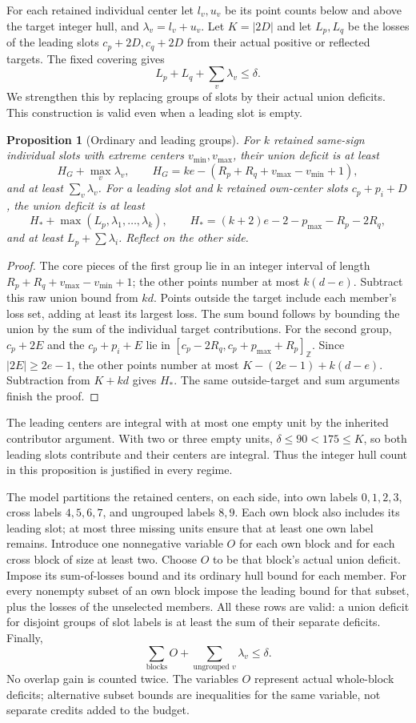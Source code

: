 \documentclass[11pt,a4paper]{article}
\newcommand{\Z}{\mathbb Z}
\newtheorem{proposition}[theorem]{Proposition}
\begin{document}
For each retained individual center let $l_v,u_v$ be its point counts
below and above the target integer hull, and $\lambda_v=l_v+u_v$.
Let $K=|2D|$ and let $L_p,L_q$ be the losses of the leading slots
$c_p+2D,c_q+2D$ from their actual positive or reflected targets.
The fixed covering gives
\begin{equation}\label{loss}
 L_p+L_q+\sum_v\lambda_v\le\delta.
\end{equation}
We strengthen this by replacing groups of slots by their actual union
deficits. This construction is valid even when a leading slot is empty.

\begin{proposition}[Ordinary and leading groups]
For $k$ retained same-sign individual slots with extreme centers
$v_{\min},v_{\max}$, their union deficit is at least
\[
 H_G+\max_v\lambda_v,\qquad
 H_G=ke-(R_p+R_q+v_{\max}-v_{\min}+1),
\]
and at least $\sum_v\lambda_v$.
For a leading slot and $k$ retained own-center slots $c_p+p_i+D$,
the union deficit is at least
\[
 H_*+\max(L_p,\lambda_1,\ldots,\lambda_k),\qquad
 H_*=(k+2)e-2-p_{\max}-R_p-2R_q,
\]
and at least $L_p+\sum\lambda_i$. Reflect on the other side.
\end{proposition}
\begin{proof}
The core pieces of the first group lie in an integer interval of length
$R_p+R_q+v_{\max}-v_{\min}+1$; the other points number at most
$k(d-e)$. Subtract this raw union bound from $kd$. Points outside the
target include each member's loss set, adding at least its largest
loss. The sum bound follows by bounding the union by the sum of the
individual target contributions.
For the second group, $c_p+2E$ and the $c_p+p_i+E$ lie in
$[c_p-2R_q,c_p+p_{\max}+R_p]_{\Z}$. Since $|2E|\ge2e-1$, the other
points number at most $K-(2e-1)+k(d-e)$. Subtraction from $K+kd$
gives $H_*$. The same outside-target and sum arguments finish the proof.
\end{proof}
The leading centers are integral with at most one empty unit by the
inherited contributor argument. With two or three empty units,
$\delta\le90<175\le K$, so both leading slots contribute and their
centers are integral. Thus the integer hull count in this proposition
is justified in every regime.

The model partitions the retained centers, on each side, into own labels
$0,1,2,3$, cross labels $4,5,6,7$, and ungrouped labels $8,9$.
Each own block also includes its leading slot; at most three missing
units ensure that at least one own label remains. Introduce one
nonnegative variable $O$ for each own block and for each cross block of
size at least two. Choose $O$ to be that block's actual union deficit.
Impose its sum-of-losses bound and its ordinary hull bound for each
member. For every nonempty subset of an own block impose the leading
bound for that subset, plus the losses of the unselected members.
All these rows are valid: a union deficit for disjoint groups of slot
labels is at least the sum of their separate deficits. Finally,
\[
 \sum_{\text{blocks}}O+\sum_{\text{ungrouped }v}\lambda_v\le\delta.
\]
No overlap gain is counted twice. The variables $O$ represent actual
whole-block deficits; alternative subset bounds are inequalities for
the same variable, not separate credits added to the budget.
\end{document}
